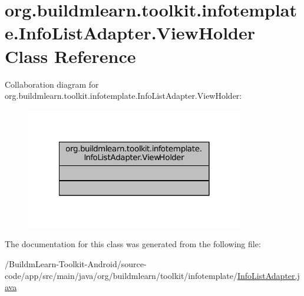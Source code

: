 \hypertarget{classorg_1_1buildmlearn_1_1toolkit_1_1infotemplate_1_1InfoListAdapter_1_1ViewHolder}{\section{org.\-buildmlearn.\-toolkit.\-infotemplate.\-Info\-List\-Adapter.\-View\-Holder Class Reference}
\label{classorg_1_1buildmlearn_1_1toolkit_1_1infotemplate_1_1InfoListAdapter_1_1ViewHolder}
}


Collaboration diagram for org.\-buildmlearn.\-toolkit.\-infotemplate.\-Info\-List\-Adapter.\-View\-Holder\-:
\nopagebreak
\begin{figure}[H]
\begin{center}
\leavevmode
\includegraphics[width=270pt]{da/da2/classorg_1_1buildmlearn_1_1toolkit_1_1infotemplate_1_1InfoListAdapter_1_1ViewHolder__coll__graph}
\end{center}
\end{figure}


The documentation for this class was generated from the following file\-:\begin{DoxyCompactItemize}
\item 
/\-Buildm\-Learn-\/\-Toolkit-\/\-Android/source-\/code/app/src/main/java/org/buildmlearn/toolkit/infotemplate/\hyperlink{InfoListAdapter_8java}{Info\-List\-Adapter.\-java}\end{DoxyCompactItemize}
